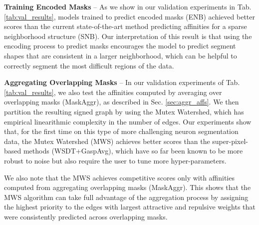 \textbf{Training Encoded Masks} -- As we show in our validation experiments in Tab. \ref{tab:val_results}, models trained to predict encoded \maskname masks (ENB) achieved better scores than the current state-of-the-art method predicting affinities for a sparse neighborhood structure (SNB). 
Our interpretation of this result is that using the encoding process to predict \maskname masks encourages the model to predict segment shapes that are consistent in a larger neighborhood, which can be helpful to correctly segment the most difficult regions of the data. 



\textbf{Aggregating Overlapping Masks}  -- 
In our validation experiments of Tab. \ref{tab:val_results}, we also test the affinities computed by averaging over overlapping masks (MaskAggr), as described in Sec. \ref{sec:aggr_affs}. We then partition the resulting signed graph by using the Mutex Watershed, which has empirical linearithmic complexity in the number of edges. 
Our experiments show that, for the first time on this type of more challenging neuron segmentation data, the Mutex Watershed (MWS) achieves better scores than the super-pixel-based methods (WSDT+GaspAvg), which have so far been known to be more robust to noise but also require the user to tune more hyper-parameters.   

We also note that the MWS achieves competitive scores only with affinities computed from aggregating overlapping masks (MaskAggr).
This shows that the MWS algorithm can take full advantage of the \maskname aggregation process by assigning the highest priority to the edges with largest attractive and repulsive weights that were consistently predicted across overlapping masks.

